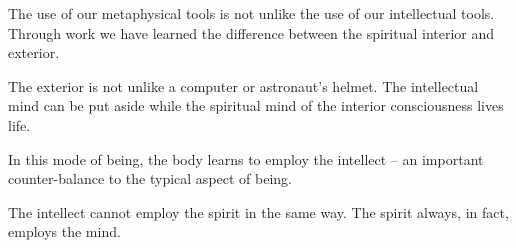 

The use of our metaphysical tools is not unlike the use of our
intellectual tools.  Through work we have learned the difference
between the spiritual interior and exterior.  

The exterior is not unlike a computer or astronaut's helmet.  The
intellectual mind can be put aside while the spiritual mind of the
interior consciousness lives life.  

In this mode of being, the body learns to employ the intellect -- an
important counter-balance to the typical aspect of being.

The intellect cannot employ the spirit in the same way.  The spirit
always, in fact, employs the mind.

\bye
